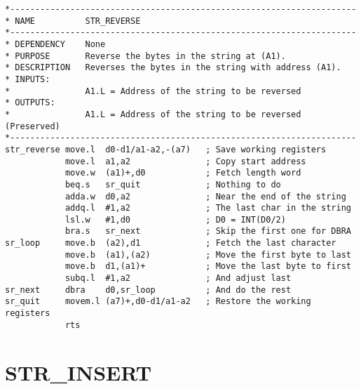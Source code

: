 \begin{lstlisting}[firstnumber=1,caption={STR\_REVERSE}]
*---------------------------------------------------------------------
* NAME          STR_REVERSE
*---------------------------------------------------------------------
* DEPENDENCY    None
* PURPOSE       Reverse the bytes in the string at (A1).
* DESCRIPTION   Reverses the bytes in the string with address (A1).
* INPUTS:
*               A1.L = Address of the string to be reversed
* OUTPUTS:
*               A1.L = Address of the string to be reversed (Preserved)
*---------------------------------------------------------------------
str_reverse move.l  d0-d1/a1-a2,-(a7)   ; Save working registers
            move.l  a1,a2               ; Copy start address
            move.w  (a1)+,d0            ; Fetch length word
            beq.s   sr_quit             ; Nothing to do
            adda.w  d0,a2               ; Near the end of the string
            addq.l  #1,a2               ; The last char in the string
            lsl.w   #1,d0               ; D0 = INT(D0/2)
            bra.s   sr_next             ; Skip the first one for DBRA
sr_loop     move.b  (a2),d1             ; Fetch the last character
            move.b  (a1),(a2)           ; Move the first byte to last
            move.b  d1,(a1)+            ; Move the last byte to first
            subq.l  #1,a2               ; And adjust last
sr_next     dbra    d0,sr_loop          ; And do the rest
sr_quit     movem.l (a7)+,d0-d1/a1-a2   ; Restore the working registers
            rts
\end{lstlisting}

\section{STR\_INSERT}
\label{ch9-STR_INSERT}%

